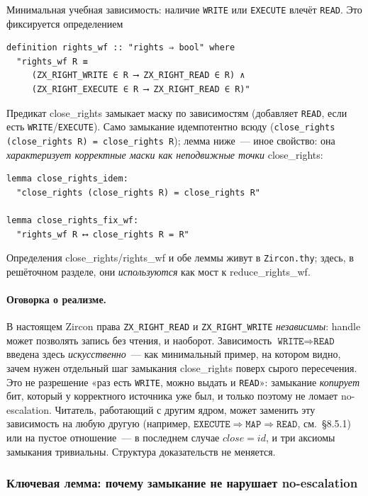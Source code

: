 \documentclass[11pt,a4paper]{article}
\newcommand{\isabel}[1]{{\isabelleit #1}}
\newcommand{\lemmaname}[1]{\isabel{#1}}
\begin{document}
Минимальная учебная зависимость: наличие \texttt{WRITE} или
\texttt{EXECUTE} влечёт \texttt{READ}. Это фиксируется определением
\begin{lstlisting}
definition rights_wf :: "rights ⇒ bool" where
  "rights_wf R ≡
     (ZX_RIGHT_WRITE ∈ R ⟶ ZX_RIGHT_READ ∈ R) ∧
     (ZX_RIGHT_EXECUTE ∈ R ⟶ ZX_RIGHT_READ ∈ R)"
\end{lstlisting}
Предикат \lemmaname{close\_rights} замыкает маску по зависимостям
(добавляет \texttt{READ}, если есть \texttt{WRITE}/\texttt{EXECUTE}).
Само замыкание идемпотентно всюду
(\texttt{close\_rights (close\_rights R) = close\_rights R}); лемма
ниже~--- иное свойство: она \emph{характеризует корректные маски как
	неподвижные точки} \lemmaname{close\_rights}:
\begin{lstlisting}
lemma close_rights_idem:
  "close_rights (close_rights R) = close_rights R"

lemma close_rights_fix_wf:
  "rights_wf R ⟷ close_rights R = R"
\end{lstlisting}
Определения \lemmaname{close\_rights}/\lemmaname{rights\_wf} и обе леммы
живут в \texttt{Zircon.thy}; здесь, в решёточном разделе, они
\emph{используются} как мост к \lemmaname{reduce\_rights\_wf}.

\paragraph{Оговорка о реализме.}
В настоящем Zircon права \texttt{ZX\_RIGHT\_READ} и
\texttt{ZX\_RIGHT\_WRITE} \emph{независимы}: handle может позволять
запись без чтения, и наоборот. Зависимость
$\texttt{WRITE} \Rightarrow \texttt{READ}$ введена здесь
\emph{искусственно}~--- как минимальный пример, на котором видно,
зачем нужен отдельный шаг замыкания \lemmaname{close\_rights} поверх
сырого пересечения. Это не разрешение «раз есть \texttt{WRITE}, можно
выдать и \texttt{READ}»: замыкание \emph{копирует} бит, который у
корректного источника уже был, и только поэтому не ломает no-escalation.
Читатель, работающий с другим ядром, может заменить
эту зависимость на любую другую (например,
$\texttt{EXECUTE} \Rightarrow \texttt{MAP} \Rightarrow \texttt{READ}$,
см.~§8.5.1) или на пустое отношение~--- в последнем случае
$\mathit{close} = \mathit{id}$, и три аксиомы замыкания тривиальны.
Структура доказательств не меняется.

\subsubsection{Ключевая лемма: почему замыкание не нарушает
	no-escalation}
\end{document}
